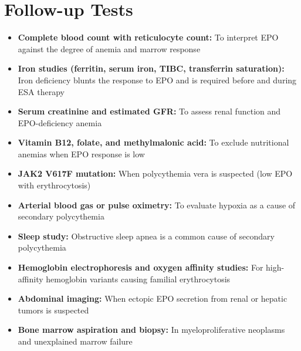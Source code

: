 \section*{Follow-up Tests}
\begin{itemize}
  \item \textbf{Complete blood count with reticulocyte count:} To interpret EPO against the degree of anemia and marrow response
  \item \textbf{Iron studies (ferritin, serum iron, TIBC, transferrin saturation):} Iron deficiency blunts the response to EPO and is required before and during ESA therapy
  \item \textbf{Serum creatinine and estimated GFR:} To assess renal function and EPO-deficiency anemia
  \item \textbf{Vitamin B12, folate, and methylmalonic acid:} To exclude nutritional anemias when EPO response is low
  \item \textbf{JAK2 V617F mutation:} When polycythemia vera is suspected (low EPO with erythrocytosis)
  \item \textbf{Arterial blood gas or pulse oximetry:} To evaluate hypoxia as a cause of secondary polycythemia
  \item \textbf{Sleep study:} Obstructive sleep apnea is a common cause of secondary polycythemia
  \item \textbf{Hemoglobin electrophoresis and oxygen affinity studies:} For high-affinity hemoglobin variants causing familial erythrocytosis
  \item \textbf{Abdominal imaging:} When ectopic EPO secretion from renal or hepatic tumors is suspected
  \item \textbf{Bone marrow aspiration and biopsy:} In myeloproliferative neoplasms and unexplained marrow failure
\end{itemize}

